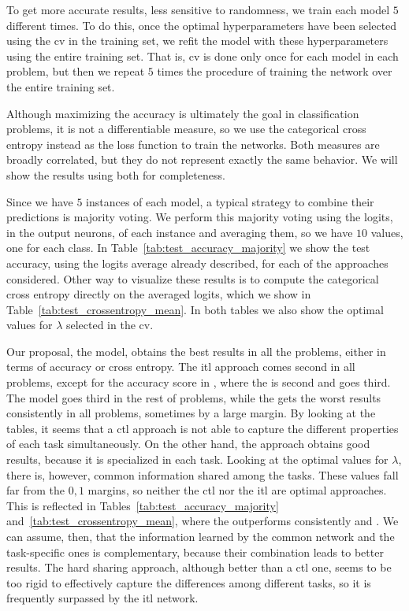 To get more accurate results, less sensitive to randomness, we train each model $5$ different times. To do this, once the optimal hyperparameters have been selected using the \acrshort{cv} in the training set, we refit the model with these hyperparameters using the entire training set. That is, \acrshort{cv} is done only once for each model in each problem, but then we repeat $5$ times the procedure of training the network over the entire training set.

Although maximizing the accuracy is ultimately the goal in classification problems, it is not a differentiable measure, so we use the categorical cross entropy instead as the loss function to train the networks. Both measures are broadly correlated, but they do not represent exactly the same behavior. We will show the results using both for completeness.

Since we have $5$ instances of each model, a typical strategy to combine their predictions is majority voting. We perform this majority voting using the logits, in the output neurons, of each instance and averaging them, so we have $10$ values, one for each class.
In Table~\ref{tab:test_accuracy_majority} we show the test accuracy, using the logits average already described, for each of the approaches considered.
%
Other way to visualize these results is to compute the categorical cross entropy directly on the averaged logits, which we show in Table~\ref{tab:test_crossentropy_mean}.
%
In both tables we also show the optimal values for $\lambda$ selected in the \acrshort{cv}.

Our proposal, the  model, obtains the best results in all the problems, either in terms of accuracy or cross entropy.
The \acrshort{itl} approach comes second in all problems, except for the accuracy score in , where the  is second and  goes third.
The  model goes third in the rest of problems, while the  gets the worst results consistently in all problems, sometimes by a large margin.
%
By looking at the tables, it seems that a \acrshort{ctl} approach is not able to capture the different properties of each task simultaneously. On the other hand, the  approach obtains good results, because it is specialized in each task.
Looking at the optimal values for $\lambda$, there is, however, common information shared among the tasks. These values fall far from the $0, 1$ margins, so neither the \acrshort{ctl} nor the \acrshort{itl} are optimal approaches. This is reflected in Tables~\ref{tab:test_accuracy_majority} and~\ref{tab:test_crossentropy_mean}, where the  outperforms consistently  and . We can assume, then, that the information learned by the common network and the task-specific ones is complementary, because their combination leads to better results.
%
The hard sharing approach, although better than a \acrshort{ctl} one, seems to be too rigid to effectively capture the differences among different tasks, so it is frequently surpassed by the \acrshort{itl} network.




